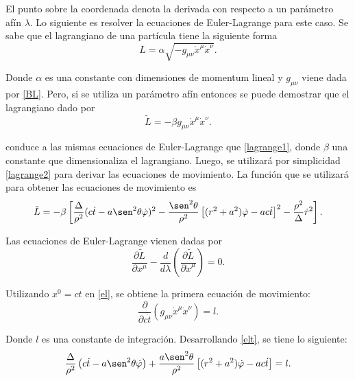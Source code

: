 El punto sobre la coordenada denota la derivada con respecto a un par\'ametro af\'in $\lambda$. Lo siguiente es resolver la ecuaciones de Euler-Lagrange para este caso. Se sabe que el lagrangiano de una part\'icula tiene la siguiente forma
\begin{equation} \label{lagrange1}
L=\alpha\sqrt{-g_{\mu \nu}\dot{x}^{\mu}\dot{x}^{\nu}}.
\end{equation}
 
Donde $\alpha$ es una constante con dimensiones de momentum lineal y $g_{\mu \nu}$ viene dada por \eqref{BL}. Pero, si se utiliza un par\'ametro af\'in entonces se puede demostrar que el lagrangiano dado por
\begin{equation} \label{lagrange2}
\tilde{L}=-\beta g_{\mu \nu}\dot{x}^{\mu}\dot{x}^{\nu}.
\end{equation}
 
conduce a las mismas ecuaciones de Euler-Lagrange que \eqref{lagrange1}, donde $\beta$ una constante que dimensionaliza el lagrangiano. Luego, se utilizar\'a por simplicidad \eqref{lagrange2} para derivar las ecuaciones de movimiento. La funci\'on que se utilizar\'a para obtener las ecuaciones de movimiento es
\begin{equation}\label{lagrangeano1}
\tilde{L}=-\beta\left[\frac{\Delta}{\rho^2}(c\dot{t}-a\sen^2\theta \dot{\varphi})^2-\frac{\sen^2\theta}{\rho^2}\left[(r^2+a^2)\dot{\varphi}-ac\dot{t} \right]^2-\frac{\rho^2}{\Delta}\dot{r}^2\right].
\end{equation}

Las ecuaciones de Euler-Lagrange vienen dadas por
\begin{equation}\label{el}
\frac{\partial \tilde{L}}{\partial x^{\mu}}-\frac{d}{d\lambda}\left(\frac{\partial \tilde{L}}{\partial \dot{x}^{\mu}} \right)=0.
\end{equation}

Utilizando $x^0=ct$ en \eqref{el}, se obtiene la primera ecuaci\'on de movimiento:
\begin{equation}\label{elt}
\frac{\partial}{\partial c\dot{t}}\left(g_{\mu \nu}\dot{x}^{\mu}\dot{x}^{\nu}\right)=l.
\end{equation}
 
Donde $l$ es una constante de integraci\'on. Desarrollando \eqref{elt}, se tiene lo siguiente:
\begin{equation}\label{11}
\frac{\Delta}{\rho^2}\left(c\dot{t}-a\sen^2 \theta \dot{\varphi}\right)+\frac{a\sen^2 \theta}{\rho^2}\left[(r^2+a^2)\dot{\varphi}-ac\dot{t} \right]=l.
\end{equation} 
 
